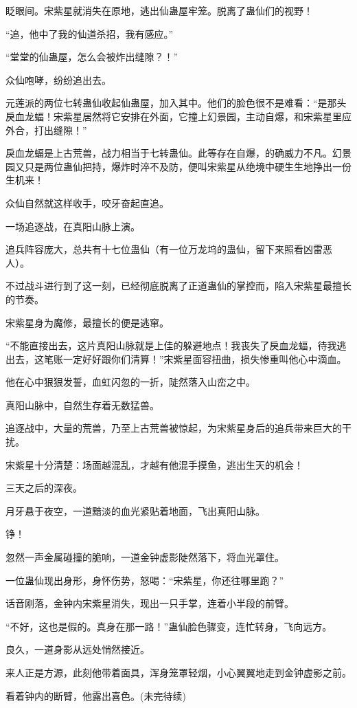 \begin{this_body}
眨眼间。宋紫星就消失在原地，逃出仙蛊屋牢笼。脱离了蛊仙们的视野！

“追，他中了我的仙道杀招，我有感应。”

“堂堂的仙蛊屋，怎么会被炸出缝隙？！”

众仙咆哮，纷纷追出去。

元莲派的两位七转蛊仙收起仙蛊屋，加入其中。他们的脸色很不是难看：“是那头戾血龙蝠！宋紫星居然将它安排在外面，它撞上幻景园，主动自爆，和宋紫星里应外合，打出缝隙！”

戾血龙蝠是上古荒兽，战力相当于七转蛊仙。此等存在自爆，的确威力不凡。幻景园又只是两位蛊仙把持，爆炸时淬不及防，便叫宋紫星从绝境中硬生生地挣出一份生机来！

众仙自然就这样收手，咬牙奋起直追。

一场追逐战，在真阳山脉上演。

追兵阵容庞大，总共有十七位蛊仙（有一位万龙坞的蛊仙，留下来照看凶雷恶人）。

不过战斗进行到了这一刻，已经彻底脱离了正道蛊仙的掌控而，陷入宋紫星最擅长的节奏。

宋紫星身为魔修，最擅长的便是逃窜。

“不能直接出去，这片真阳山脉就是上佳的躲避地点！我丧失了戾血龙蝠，待我逃出去，这笔账一定好好跟你们清算！”宋紫星面容扭曲，损失惨重叫他心中滴血。

他在心中狠狠发誓，血虹闪忽的一折，陡然落入山峦之中。

真阳山脉中，自然生存着无数猛兽。

追逐战中，大量的荒兽，乃至上古荒兽被惊起，为宋紫星身后的追兵带来巨大的干扰。

宋紫星十分清楚：场面越混乱，才越有他混手摸鱼，逃出生天的机会！

三天之后的深夜。

月牙悬于夜空，一道黯淡的血光紧贴着地面，飞出真阳山脉。

铮！

忽然一声金属碰撞的脆响，一道金钟虚影陡然落下，将血光罩住。

一位蛊仙现出身形，身怀伤势，怒喝：“宋紫星，你还往哪里跑？”

话音刚落，金钟内宋紫星消失，现出一只手掌，连着小半段的前臂。

“不好，这也是假的。真身在那一路！”蛊仙脸色骤变，连忙转身，飞向远方。

良久，一道身影从远处悄然接近。

来人正是方源，此刻他带着面具，浑身笼罩轻烟，小心翼翼地走到金钟虚影之前。

看着钟内的断臂，他露出喜色。(未完待续)

\end{this_body}

